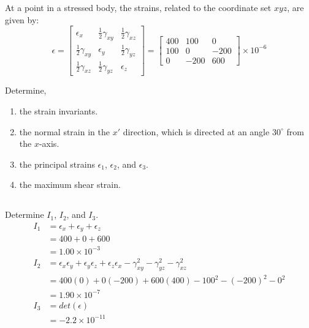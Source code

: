 \section{}

At a point in a stressed body, the strains, related to the coordinate set $xyz$, are given by:
\begin{equation}
    \epsilon = 
    \begin{bmatrix}
        \epsilon_{x} & \frac{1}{2} \gamma_{xy} & \frac{1}{2} \gamma_{xz} \\
        \frac{1}{2} \gamma_{xy} & \epsilon_{y} & \frac{1}{2} \gamma_{yz} \\
        \frac{1}{2} \gamma_{xz} & \frac{1}{2} \gamma_{yz} & \epsilon_{z}
    \end{bmatrix}
    = 
    \begin{bmatrix}
        400 & 100 & 0 \\
        100 & 0 & -200 \\
        0 & -200 & 600  
    \end{bmatrix}
    \times 10^{-6}
\end{equation}

Determine,
\begin{enumerate}[label=(\alph*)]
    \item the strain invariants.
    \item the normal strain in the $x'$ direction, which is directed at an angle $30^\circ$ from the $x$-axis.
    \item the principal strains $\epsilon_1$, $\epsilon_2$, and $\epsilon_3$.
    \item the maximum shear strain.
\end{enumerate}

\subsection{}
Determine $I_1$, $I_2$, and $I_3$.
\begin{align*}
    I_1 &= \epsilon_{x} + \epsilon_{y} + \epsilon_{z} \\
    &= 400 + 0 + 600 \\
    &= \boxed{1.00 \times 10^{-3}} \\
    I_2 &= \epsilon_{x}\epsilon_{y} + \epsilon_{y}\epsilon_{z} + \epsilon_{z}\epsilon_{x} - \gamma_{xy}^2 - \gamma_{yz}^2 - \gamma_{xz}^2 \\
    &= 400(0) + 0(-200) + 600(400) - 100^2 - (-200)^2 - 0^2 \\
    &= \boxed{1.90 \times 10^{-7}} \\
    I_3 &= det(\epsilon) \\
    & = \boxed{-2.2 \times 10^{-11}}
\end{align*}

